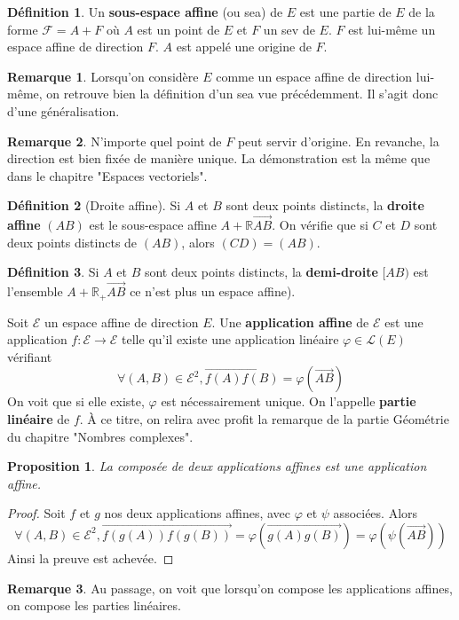 \documentclass[french]{book}
\theoremstyle{plain}
\newtheorem{prop}{Proposition}[chapter]
\theoremstyle{definition}
\newtheorem{dfn}{Définition}[chapter]
\newtheorem{rmq}{Remarque}[chapter]
\theoremstyle{remark}
\begin{document}
\begin{dfn}
	Un \textbf{sous-espace affine} (ou sea) de $E$ est une partie de $E$ de la forme $\mathcal{F}=A+F$ où $A$ est un point de $E$ et $F$ un sev de $E$. $F$ est lui-même un espace affine de direction $F$. $A$ est appelé une origine de $F$.
\end{dfn}
\begin{rmq}
	Lorsqu'on considère $E$ comme un espace affine de direction lui-même, on
retrouve bien la définition d'un sea vue précédemment. Il s'agit donc d'une généralisation.
\end{rmq}
\begin{rmq}
	N'importe quel point de $F$ peut servir d'origine. En revanche, la direction
est bien fixée de manière unique. La démonstration est la même que dans le chapitre "Espaces vectoriels".
\end{rmq}
\begin{dfn}[Droite affine]
	Si $A$ et $B$ sont deux points distincts, la \textbf{droite affine} $(AB)$ est le sous-espace affine $A+\mathbb{R}\overrightarrow{AB}.$ On vérifie que si $C$ et $D$ sont deux points distincts de $(AB)$, alors $(CD)=(AB)$.
\end{dfn}
\begin{dfn}
	Si $A$ et $B$ sont deux points distincts, la \textbf{demi-droite} $[AB)$ est l'ensemble $A+\mathbb{R}_{+}\overrightarrow{AB}$ ce n'est plus un espace affine).
\end{dfn}
 Soit $\mathcal{E}$ un espace affine de direction $E$. Une \textbf{application affine} de $\mathcal{E}$ est une application $f:\mathcal{E}\rightarrow\mathcal{E}$ telle qu'il existe une application linéaire $\varphi\in\mathcal{L}(E)$ vérifiant
$$\forall(A,B)\in\mathcal{E}^{2},\overrightarrow{f(A)f(B)}=\varphi(\overrightarrow{AB})$$
On voit que si elle existe, $\varphi$ est nécessairement unique. On l'appelle \textbf{partie linéaire} de $f$.
À ce titre, on relira avec profit la remarque de la partie Géométrie du chapitre "Nombres complexes".
\begin{prop}
	La composée de deux applications affines est une application affine.
\end{prop}
\begin{proof}
	Soit $f$ et $g$ nos deux applications affines, avec $\varphi$ et $\psi$ associées. Alors $$\forall(A,B)\in\mathcal{E}^{2},\overrightarrow{f(g(A))f(g(B))}=\varphi(\overrightarrow{g(A)g(B)})=\varphi(\psi(\overrightarrow{AB}))$$
Ainsi la preuve est achevée.
\end{proof}
\begin{rmq}
	Au passage, on voit que lorsqu'on compose les applications affines, on compose les parties linéaires.
\end{rmq}
\end{document}
